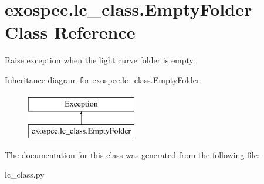 \hypertarget{classexospec_1_1lc__class_1_1_empty_folder}{}\section{exospec.\+lc\+\_\+class.\+Empty\+Folder Class Reference}
\label{classexospec_1_1lc__class_1_1_empty_folder}


Raise exception when the light curve folder is empty.  


Inheritance diagram for exospec.\+lc\+\_\+class.\+Empty\+Folder\+:\begin{figure}[H]
\begin{center}
\leavevmode
\includegraphics[height=2.000000cm]{classexospec_1_1lc__class_1_1_empty_folder}
\end{center}
\end{figure}


The documentation for this class was generated from the following file\+:\begin{DoxyCompactItemize}
\item 
lc\+\_\+class.\+py\end{DoxyCompactItemize}
